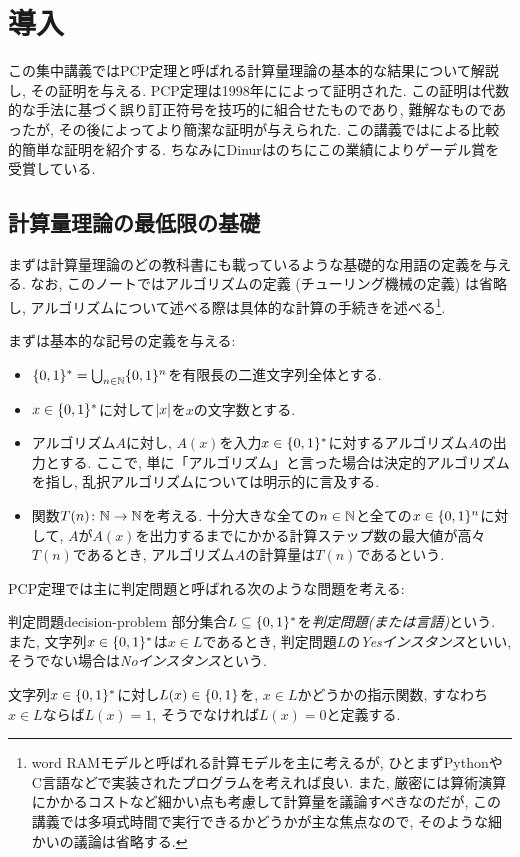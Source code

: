 \chapter{導入}

この集中講義ではPCP定理と呼ばれる計算量理論の基本的な結果について解説し, その証明を与える.
PCP定理は1998年に\citet{AroraS98,AroraLMSS98}によって証明された.
この証明は代数的な手法に基づく誤り訂正符号を技巧的に組合せたものであり, 難解なものであったが, その後\citet{Din07}によってより簡潔な証明が与えられた.
この講義では\citet{Din07}による比較的簡単な証明を紹介する.
ちなみにDinurはのちにこの業績によりゲーデル賞を受賞している.

\section{計算量理論の最低限の基礎}
まずは計算量理論のどの教科書にも載っているような基礎的な用語の定義を与える.
なお, このノートではアルゴリズムの定義 (チューリング機械の定義) は省略し, アルゴリズムについて述べる際は具体的な計算の手続きを述べる\footnote{word RAMモデルと呼ばれる計算モデルを主に考えるが, 
ひとまずPythonやC言語などで実装されたプログラムを考えれば良い. また, 厳密には算術演算にかかるコストなど細かい点も考慮して計算量を議論すべきなのだが, この講義では多項式時間で実行できるかどうかが主な焦点なので, そのような細かいの議論は省略する.}.

まずは基本的な記号の定義を与える:
\begin{itemize}
\item $\{0,1\}^*=\bigcup_{n\in\mathbb{N}}\{0,1\}^n$を有限長の二進文字列全体とする.
\item $x\in\{0,1\}^*$に対して$\lvert x\rvert$を$x$の文字数とする.
\item アルゴリズム$A$に対し, $A(x)$を入力$x \in \{0,1\}^*$に対するアルゴリズム$A$の出力とする. ここで, 単に「アルゴリズム」と言った場合は決定的アルゴリズムを指し, 乱択アルゴリズムについては明示的に言及する.
\item 関数$T(n)\colon\mathbb{N}\to\mathbb{N}$を考える. 十分大きな全ての$n\in\mathbb{N}$と全ての$x\in\{0,1\}^n$に対して, $A$が$A(x)$を出力するまでにかかる計算ステップ数の最大値が高々$T(n)$であるとき, アルゴリズム$A$の計算量は$T(n)$であるという.
\end{itemize}

PCP定理では主に判定問題と呼ばれる次のような問題を考える:

\begin{definition}{判定問題}{decision-problem}
  部分集合$L\subseteq\{0,1\}^*$を\emph{判定問題(または言語)}という.
  また, 文字列$x\in\{0,1\}^*$は$x\in L$であるとき, 判定問題$L$の\emph{Yesインスタンス}といい,
  そうでない場合は\emph{Noインスタンス}という.

  文字列$x\in\{0,1\}^*$に対し$L(x)\in\{0,1\}$を, $x\in L$かどうかの指示関数, すなわち$x\in L$ならば$L(x)=1$, そうでなければ$L(x)=0$と定義する.
\end{definition}


